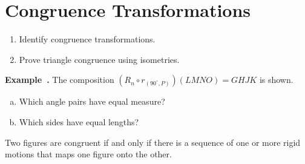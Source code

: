 \documentclass{article}
\newcounter{example}[section]
\newenvironment{example}[1][]{\refstepcounter{example}\par\medskip
   {\color{red}\textbf{Example~\theexample. #1}}}{\medskip}
\begin{document}
\section*{Congruence Transformations}

\begin{tcolorbox}[colframe=orange!70!white, coltitle=black, title=\textbf{Today I Can}]
\begin{enumerate}
    \item Identify congruence transformations.
    \item Prove triangle congruence using isometries.
\end{enumerate}
\end{tcolorbox}
\bigskip 

\begin{example}
The composition $(R_n \circ r_{(90^\circ,P)})(LMNO) = GHJK$ is shown. \newline 

\begin{minipage}{0.55\textwidth}
\begin{enumerate}[(a)]  \setlength{\itemsep}{0.5in}
    \item Which angle pairs have equal measure?
    \item Which sides have equal lengths?
\end{enumerate}
\end{minipage}
\begin{minipage}{0.4\textwidth}
\end{minipage}
\end{example}
\bigskip 

\begin{tcolorbox}[colframe=black!20!white, opacitybacktitle=0.1, coltitle=black, title=\textbf{Congruent Figures}]
Two figures are congruent if and only if there is a sequence of one or more rigid motions that maps one figure onto the other.
\end{tcolorbox}
\bigskip 
\end{document}
